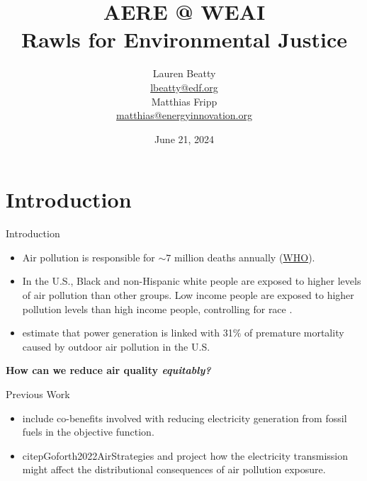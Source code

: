 \documentclass{beamer}
\title{AERE @ WEAI\\
Rawls for Environmental Justice}
\author{Lauren Beatty\\ \href{mailto:lbeatty@edf.org}{lbeatty@edf.org} \\
\vspace{.3cm}
Matthias Fripp\\
\href{mailto:matthias@energyinnovation.org}{matthias@energyinnovation.org}}
\institute{Environmental Defense Fund}
\date{June 21, 2024}
\begin{document}
\frame{\titlepage}

\section{Introduction}

\begin{frame}{Introduction}
\begin{itemize}
    \item Air pollution is responsible for $\sim 7$ million deaths annually (\href{https://www.who.int/health-topics/air-pollution#tab=tab_2}{WHO}).
    \item In the U.S.,  Black and non-Hispanic white people are exposed to higher levels of air pollution than other groups. Low income people are exposed to higher pollution levels than high income people, controlling for race \citep{Thind2019FineGeography}.
    \item \citet{Lelieveld2015TheScale} estimate that power generation is linked with 31$\%$ of premature mortality caused by outdoor air pollution in the U.S.
\end{itemize}

    \textbf{How can we reduce air quality \textit{equitably?}}
\end{frame}

\begin{frame}{Previous Work}
\begin{itemize}
    \item \citet{Sergi2020OptimizingBenefits} include co-benefits involved with reducing electricity generation from fossil fuels in the objective function.
    \item citep{Goforth2022AirStrategies} and \citep{Shawhan2024PoliciesAmericans} project how the electricity transmission might affect the distributional consequences of air pollution exposure.
\end{itemize}
\end{frame}
\end{document}
